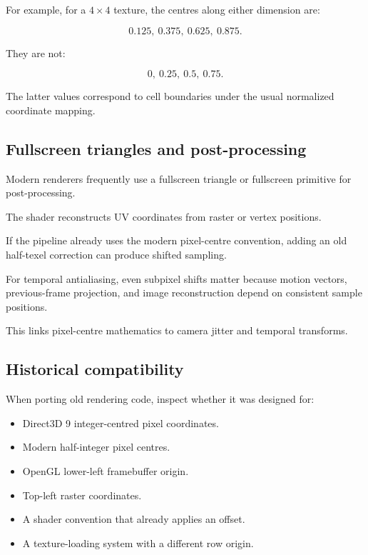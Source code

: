For example, for a \(4\times4\) texture, the centres along either dimension are:

\[
 \boxed{ 0.125,\ 0.375,\ 0.625,\ 0.875 }.
\]

They are not:

\[
 0,\ 0.25,\ 0.5,\ 0.75.
\]

The latter values correspond to cell boundaries under the usual normalized coordinate mapping.

\subsection{Fullscreen triangles and post-processing}\label{02-foundations-ii-ch033-fullscreen-triangles-and-post-processing}

\hypertarget{02-foundations-ii-ch033-fullscreen-triangles-and-post-processing}{}

Modern renderers frequently use a fullscreen triangle or fullscreen primitive for post-processing.

The shader reconstructs UV coordinates from raster or vertex positions.

If the pipeline already uses the modern pixel-centre convention, adding an old half-texel correction can produce shifted sampling.

For temporal antialiasing, even subpixel shifts matter because motion vectors, previous-frame projection, and image reconstruction depend on consistent sample positions.

This links pixel-centre mathematics to camera jitter and temporal transforms.

\subsection{Historical compatibility}\label{02-foundations-ii-ch033-historical-compatibility}

\hypertarget{02-foundations-ii-ch033-historical-compatibility}{}

When porting old rendering code, inspect whether it was designed for:

\begin{itemize}
\tightlist
\item
  Direct3D 9 integer-centred pixel coordinates.
\item
  Modern half-integer pixel centres.
\item
  OpenGL lower-left framebuffer origin.
\item
  Top-left raster coordinates.
\item
  A shader convention that already applies an offset.
\item
  A texture-loading system with a different row origin.
\end{itemize}

